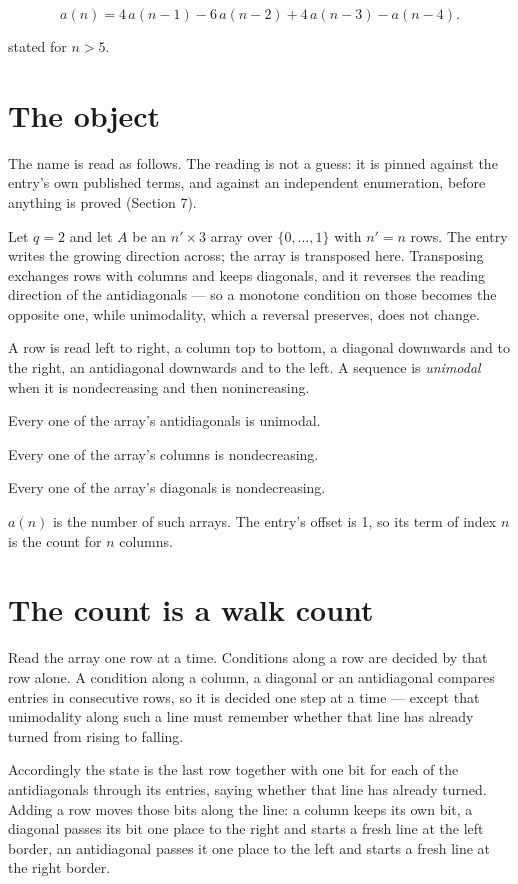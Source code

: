 \documentclass[11pt]{article}
\theoremstyle{definition}
\begin{document}
\[a(n) = 4\,a(n-1) - 6\,a(n-2) + 4\,a(n-3) - a(n-4).\]

stated for $n > 5$.

\section{The object}

The name is read as follows. The reading is not a guess: it is pinned against the entry's own published terms, and against an independent enumeration, before anything is proved (Section 7).

Let $q = 2$ and let $A$ be an $n' \times 3$ array over $\{0,\dots,1\}$ with $n' = n$ rows. The entry writes the growing direction across; the array is transposed here. Transposing exchanges rows with columns and keeps diagonals, and it reverses the reading direction of the antidiagonals --- so a monotone condition on those becomes the opposite one, while unimodality, which a reversal preserves, does not change.

A row is read left to right, a column top to bottom, a diagonal downwards and to the right, an antidiagonal downwards and to the left. A sequence is {\itshape unimodal} when it is nondecreasing and then nonincreasing.

Every one of the array's antidiagonals is unimodal.

Every one of the array's columns is nondecreasing.

Every one of the array's diagonals is nondecreasing.

$a(n)$ is the number of such arrays. The entry's offset is 1, so its term of index $n$ is the count for $n$ columns.

\section{The count is a walk count}

Read the array one row at a time. Conditions along a row are decided by that row alone. A condition along a column, a diagonal or an antidiagonal compares entries in consecutive rows, so it is decided one step at a time --- except that unimodality along such a line must remember whether that line has already turned from rising to falling.

Accordingly the state is the last row together with one bit for each of the antidiagonals through its entries, saying whether that line has already turned. Adding a row moves those bits along the line: a column keeps its own bit, a diagonal passes its bit one place to the right and starts a fresh line at the left border, an antidiagonal passes it one place to the left and starts a fresh line at the right border.
\end{document}

